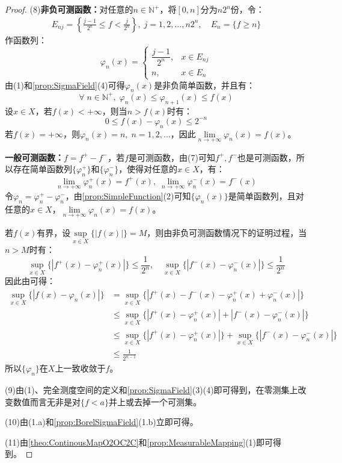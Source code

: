 \begin{proof}
	(8)\textbf{非负可测函数：}对任意的$n\in\mathbb{N}^+$，将$[0,n]$分为$n2^n$份，令：
	\begin{gather*}
		E_{nj}=\left\{\frac{j-1}{2^n}\leqslant f<\frac{j}{2^n}\right\},\;j=1,2,\dots,n2^n ,\quad E_n=\{f\geqslant n\}
	\end{gather*}
	作函数列：
	\begin{equation*}
		\varphi_n(x)=
		\begin{cases}
			\dfrac{j-1}{2^n},&x\in E_{nj} \\
			n,&x\in E_n
		\end{cases}
	\end{equation*}
	由(1)和\cref{prop:SigmaField}(4)可得$\varphi_n(x)$是非负简单函数，并且有：
	\begin{equation*}
		\forall\;n\in\mathbb{N}^+,\;\varphi_n(x)\leqslant\varphi_{n+1}(x)\leqslant f(x)
	\end{equation*}
	设$x\in X$，若$f(x)<+\infty$，则当$n>f(x)$时有：
	\begin{equation*}
		0\leqslant f(x)-\varphi_n(x)\leqslant 2^{-n}
	\end{equation*}
	若$f(x)=+\infty$，则$\varphi_n(x)=n,\;n=1,2,\dots$，因此$\lim\limits_{n\to+\infty}\varphi_n(x)=f(x)$。\par
	\textbf{一般可测函数：}$f=f^+-f^-$，若$f$是可测函数，由(7)可知$f^+,f^-$也是可测函数，所以存在简单函数列$\{\varphi_n^+\}$和$\{\varphi_n^-\}$，使得对任意的$x\in X$，有：
	\begin{equation*}
		\lim\limits_{n\to+\infty}\varphi_n^+(x)=f^+(x),\;
		\lim\limits_{n\to+\infty}\varphi_n^-(x)=f^-(x)
	\end{equation*}
	令$\varphi_n=\varphi_n^+-\varphi_n^-$，由\cref{prop:SimpleFunction}(2)可知$\{\varphi_n(x)\}$是简单函数列，且对任意的$x\in X$，$\lim\limits_{n\to+\infty}\varphi_n(x)=f(x)$。\par
	若$f(x)$有界，设$\sup\limits_{x\in X}\{|f(x)|\}=M$，则由非负可测函数情况下的证明过程，当$n>M$时有：
	\begin{equation*}
		\sup_{x\in X}\{|f^+(x)-\varphi_n^+(x)|\}\leqslant\frac{1}{2^n},\quad
		\sup_{x\in X}\{|f^-(x)-\varphi_n^-(x)|\}\leqslant\frac{1}{2^n}
	\end{equation*}
	因此由可得：
	\begin{align*}
		\sup_{x\in X}\{|f(x)-\varphi_n(x)|\}
		&=\sup_{x\in X}\{|f^+(x)-f^-(x)-\varphi_n^+(x)+\varphi_n^-(x)|\} \\
		&\leqslant\sup_{x\in X}\{|f^+(x)-\varphi_n^+(x)|+|f^-(x)-\varphi_n^-(x)|\} \\
		&\leqslant\sup_{x\in X}\{|f^+(x)-\varphi_n^+(x)|\}+\sup_{x\in X}\{|f^-(x)-\varphi_n^-(x)|\} \\
		&\leqslant\frac{1}{2^{n-1}}
	\end{align*}
	所以$\{\varphi_n\}$在$X$上一致收敛于$f$。\par
	(9)由(1)、完全测度空间的定义和\cref{prop:SigmaField}(3)(4)即可得到，在零测集上改变数值而言无非是对$\{f<a\}$并上或去掉一个可测集。\par
	(10)由(1.a)和\cref{prop:BorelSigmaField}(1.b)立即可得。\par
	(11)由\cref{theo:ContinousMapO2OC2C}和\cref{prop:MeasurableMapping}(1)即可得到。
\end{proof}
